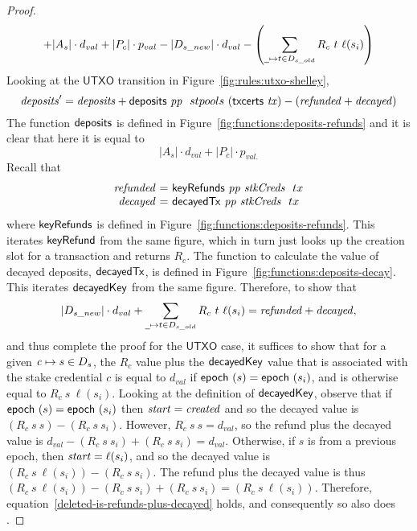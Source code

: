 \begin{proof}
\begin{equation*}
    + |A_s|\cdot d_{val}
    + |P_c|\cdot p_{val}
    - |D_{s\_new}|\cdot d_{val}
    - \left(\sum_{\wcard\mapsto t\in D_{s\_old}}R_c~t~\ell(s_i)\right)
  \end{equation*}
  Looking at the $\mathsf{UTXO}$ transition in Figure~\ref{fig:rules:utxo-shelley},
  \begin{equation*}
    \mathit{deposits}' = \mathit{deposits} + \mathsf{deposits}~ \mathit{pp} ~ \mathit{~}{stpools}~{(\mathsf{txcerts}~ \mathit{tx})}
    - (\mathit{refunded} + \mathit{decayed})
  \end{equation*}
  The function $\mathsf{deposits}$ is defined in Figure~\ref{fig:functions:deposits-refunds}
  and it is clear that here it is equal to
  $$|A_s|\cdot d_{val} + |P_c|\cdot p_{val.}$$
  Recall that
  \begin{equation*}
    \begin{array}{r@{~=~}l}
      \var{refunded} & \keyRefunds{pp}{stkCreds}~{tx} \\
      \var{decayed} & \decayedTx{pp}{stkCreds}~{tx}
    \end{array}
  \end{equation*}
  where $\mathsf{keyRefunds}$ is defined in Figure~\ref{fig:functions:deposits-refunds}.
  This iterates $\mathsf{keyRefund}$ from the same figure,
  which in turn just looks up the creation slot for a transaction and returns $R_c$.
  The function to calculate the value of decayed deposits, $\mathsf{decayedTx}$, is defined in Figure~\ref{fig:functions:deposits-decay}.
  This iterates $\mathsf{decayedKey}$ from the same figure.
  Therefore, to show that
  \begin{equation}\label{deleted-is-refunds-plus-decayed}
    |D_{s\_new}|\cdot d_{val} + \sum_{\wcard\mapsto t\in D_{s\_old}}R_c~t~\ell(s_i)
    = \var{refunded} + \var{decayed},
  \end{equation}
  and thus complete the proof for the $\mathsf{UTXO}$ case,
  it suffices to show that for a given $\mathit{c}\mapsto s\in D_s$,
  the $R_c$ value plus the $\mathsf{decayedKey}$ value that is associated with the stake
  credential $c$ is equal to $d_{val}$ if $\mathsf{epoch}~ \mathit{(}s)=\mathsf{epoch}~ \mathit{(}s_i)$, and is otherwise equal to $R_c~s~\ell(s_i)$.
  Looking at the definition of $\mathsf{decayedKey}$, observe that if $\mathsf{epoch}~ \mathit{(}s)=\mathsf{epoch}~ \mathit{(}s_i)$
  then $\mathit{start}=\mathit{created}$ and so the decayed value is $(R_c~s~s)-(R_c~s~s_i)$.
  However, $R_c~s~s = d_{val}$, so the refund plus the decayed value is
  $d_{val}-(R_c~s~s_i)+(R_c~s~s_i)=d_{val}$.
  Otherwise, if $s$ is from a previous epoch, then $\mathit{start}=\ell(s_i)$, and so
  the decayed value is $(R_c~s~\ell(s_i))-(R_c~s~s_i)$.
  The refund plus the decayed value is thus
  $(R_c~s~\ell(s_i))-(R_c~s~s_i)+(R_c~s~s_i)=(R_c~s~\ell(s_i))$.
  Therefore, equation~\ref{deleted-is-refunds-plus-decayed} holds, and
  consequently so also does .

\end{proof}

